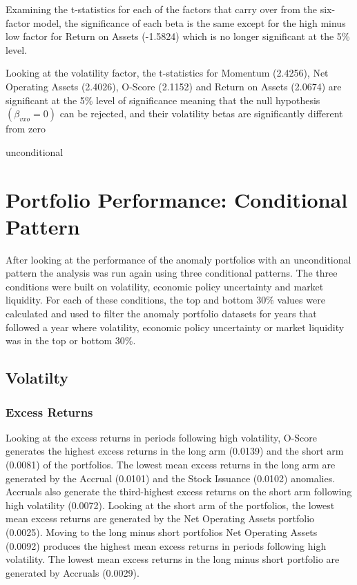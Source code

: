 \documentclass[12pt, a4paper, oneside]{article}
\begin{document}
Examining the t-statistics for each of the factors that carry over from the six-factor model, the significance of each beta is the same except for the high minus low factor for Return on Assets (-1.5824) which is no longer significant at the 5\% level. 

Looking at the volatility factor, the t-statistics for Momentum (2.4256), Net Operating Assets (2.4026), O-Score (2.1152) and Return on Assets (2.0674) are significant at the 5\% level of significance meaning that the null hypothesis $(\beta_{vxo}= 0)$ can be rejected, and their volatility betas are significantly different from zero

{unconditional}

\section{Portfolio Performance: Conditional Pattern}\label{sec:conditional}
After looking at the performance of the anomaly portfolios with an unconditional pattern the analysis was run again using three conditional patterns. The three conditions were built on volatility, economic policy uncertainty and market liquidity. For each of these conditions, the top and bottom 30\% values were calculated and used to filter the anomaly portfolio datasets for years that followed a year where volatility, economic policy uncertainty or market liquidity was in the top or bottom 30\%.

\subsection{Volatilty}
\subsubsection{Excess Returns}
Looking at the excess returns in periods following high volatility, O-Score generates the highest excess returns in the long arm (0.0139) and the short arm (0.0081) of the portfolios. The lowest mean excess returns in the long arm are generated by the Accrual (0.0101) and the Stock Issuance (0.0102) anomalies. Accruals also generate the third-highest excess returns on the short arm following high volatility (0.0072). Looking at the short arm of the portfolios, the lowest mean excess returns are generated by the Net Operating Assets portfolio (0.0025). Moving to the long minus short portfolios Net Operating Assets (0.0092) produces the highest mean excess returns in periods following high volatility. The lowest mean excess returns in the long minus short portfolio are generated by Accruals (0.0029).
\end{document}
